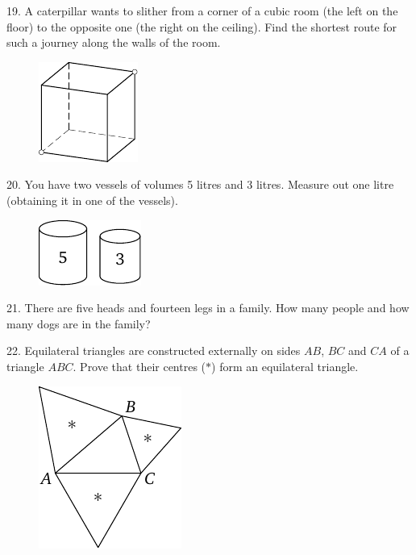 \begin{problem}{19.}
	A caterpillar wants to slither from a corner of a cubic room (the left on the floor) to the opposite one
	(the right on the ceiling).
	Find the shortest route for such a journey along the walls of the room.
	\begin{figure}[h]
	\centering
	\footnotesize
	\includegraphics[scale=1]{taskbook-3}
	\end{figure}
\end{problem}

\begin{problem}{20.}
	You have two vessels of volumes 5 litres and 3 litres. Measure out one litre (obtaining it in one of the vessels).

	\begin{figure}[h!]
	\centering
	\footnotesize
	\includegraphics[scale=1]{taskbook-4}
	\end{figure}
\end{problem}

\begin{problem}{21.}
	There are five heads and fourteen legs in a family. How many people and how many dogs are in the family?
\end{problem}

\begin{problem}{22.}
	Equilateral triangles are constructed externally on sides $AB$, $BC$ and $CA$ of a triangle $ABC$.
	Prove that their centres ($*$) form an equilateral triangle.
	\begin{figure}[h!]
	\includegraphics[scale=1]{taskbook-6}
	\end{figure}
\end{problem}

